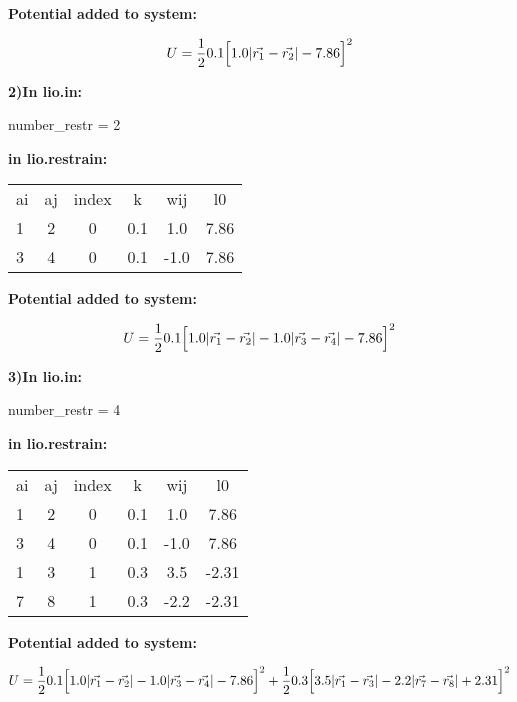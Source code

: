 \documentclass[journal=jctcce,manuscript=article]{achemso}
\begin{document}
    \textbf{Potential added to system:}
    
    \begin{equation}
      U=\frac{1}{2} 0.1 \Big{[} 1.0 |\vec{r_1} - \vec{r_2}| - 7.86\Big{]}^2  
      \label{Ex1}
    \end{equation}
    
    
    \textbf{2)In lio.in:}
    
    number\_restr = 2
    
    \textbf{in lio.restrain:}
    
    \begin{table}  [H]
      \begin{center}
      \begin{tabular}{ l c c c c c} 
         ai & aj & index &   k  &    wij   &  l0    \\
         1  &  2 &   0   &  0.1 &    1.0   & 7.86   \\
         3  &  4 &   0   &  0.1 &   -1.0   & 7.86   \\
       \end{tabular}
       \end{center}
      \label{Tex2}
    \end{table}

    \textbf{Potential added to system:}
    
    \begin{equation}
      U=\frac{1}{2} 0.1 \Big{[} 1.0 |\vec{r_1} - \vec{r_2}| - 1.0 |\vec{r_3} - \vec{r_4}| - 7.86\Big{]}^2  
      \label{Ex2}
    \end{equation}
    
    
    \textbf{3)In lio.in:}
    
    number\_restr = 4
    
    \textbf{in lio.restrain:}
    
    \begin{table}  [H]
      \begin{center}
      \begin{tabular}{ l c c c c c} 
         ai & aj & index &   k  &    wij   &  l0    \\
         1  &  2 &   0   &  0.1 &    1.0   & 7.86   \\
         3  &  4 &   0   &  0.1 &   -1.0   & 7.86   \\
         1  &  3 &   1   &  0.3 &    3.5   & -2.31   \\
         7  &  8 &   1   &  0.3 &   -2.2   & -2.31   \\
       \end{tabular}
       \end{center}
      \label{Tex3}
    \end{table}

    \textbf{Potential added to system:}
    
    \begin{equation}
      U=\frac{1}{2} 0.1 \Big{[} 1.0 |\vec{r_1} - \vec{r_2}| - 1.0 |\vec{r_3} - \vec{r_4}| - 7.86\Big{]}^2 + \frac{1}{2} 0.3 \Big{[} 3.5 |\vec{r_1} - \vec{r_3}| - 2.2 |\vec{r_7} - \vec{r_8}| +2.31\Big{]}^2 
      \label{Ex3}
    \end{equation}
    
\end{document}
